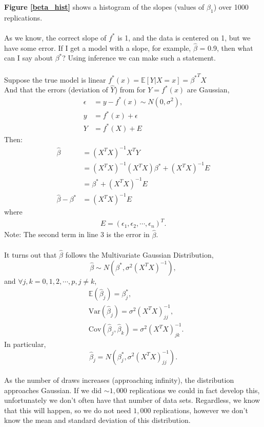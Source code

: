 \documentclass[a4paper]{article}
\begin{document}
\textbf{Figure \ref{beta_hist}} shows a histogram of the slopes (values of $\beta_1$) over 1000 replications.\\ \\
As we know, the correct slope of $f^*$ is 1, and the data is centered on 1, but we have some error. If I get a model with a slope, for example, $\hat{\beta}$ = 0.9, then what can I say about $\beta^*$? Using inference we can make such a statement. \\ \\
Suppose the true model is linear $f^*(x) = \mathbb{E}[Y|X=x] = {\beta^{*}}^T X$\\
And that the errors (deviation of $\hat{Y}$) from for $Y = f^*(x)$ are Gaussian,
\begin{align*}
\epsilon&=y-f^*(x)\sim N(0, \sigma^2), \\
y&=f^*(x)+\epsilon \\
Y&=f^*(X)+E
\end{align*}
\bigskip
Then:
\begin{align*}
\hat{\beta}&=(X^T X)^{-1}X^T Y \\
&=(X^T X)^{-1}(X^T X){\beta}^* + (X^T X)^{-1}E \\
&={\beta}^* + (X^T X)^{-1}E\\
\hat{\beta} - {\beta}^* &= (X^T X)^{-1}E
\end{align*}
where
\begin{align*}
E=(\epsilon_1, \epsilon_2, \cdots, \epsilon_n)^T.
\end{align*}
Note: The second term in line 3 is the error in $\hat{\beta}$.\\ \\
It turns out that $\hat{\beta}$ follows the Multivariate Gaussian Distribution,
\[
\hat{\beta}\sim N(\beta^*, \sigma^2(X^T X)^{-1}),
\]
and $\forall j, k=0,1,2,\cdots,p,j\ne k$,
\begin{align*}
&\mathbb{E}(\hat{\beta}_j)=\beta^*_j,\\
&\mbox{Var}(\hat{\beta}_j)=\sigma^2(X^T X)^{-1}_{jj},\\
&\mbox{Cov}(\hat{\beta}_j,\hat{\beta}_k)=\sigma^2(X^T X)^{-1}_{jk}.
\end{align*}
In particular,
\[
\hat{\beta}_j=N(\beta^*_j,\sigma^2(X^T X)^{-1}_{jj}).
\]
\\
As the number of draws increases (approaching infinity), the distribution approaches Gaussian. If we did $\sim 1,000$ replications we could in fact develop this, unfortunately we don’t often have that number of data sets. Regardless, we know that this will happen, so we do not need $1,000$ replications, however we don’t know the mean and standard deviation of this distribution.\\ \\
\end{document}
